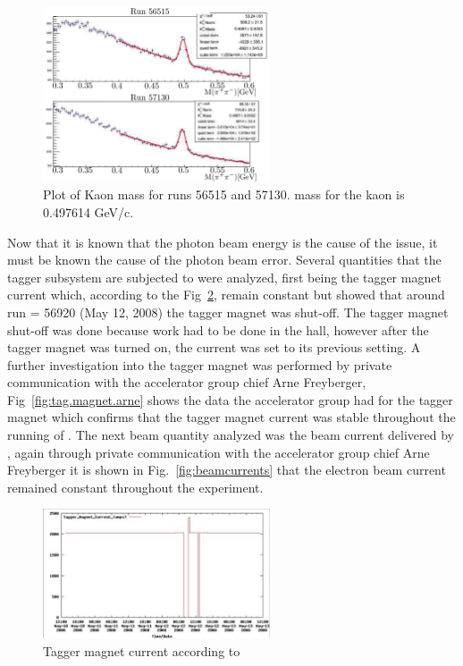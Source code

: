\begin{figure}\begin{center}
\includegraphics[width=0.6\textwidth]{figures/calib/tag/ecor/Kaon_mass.eps}
\caption[Kaon Mass for Run 56515 and 57130]{\label{fig:beamcor.k_mass}Plot of Kaon mass for runs 56515 and 57130.   mass for the kaon is 0.497614 GeV/c.}
\end{center}\end{figure}

\FloatBarrier

Now that it is known that the photon beam energy is the cause of the issue, it must be known the cause of the photon beam error. Several quantities that the tagger subsystem are subjected to were analyzed, first being the tagger magnet current which, according to the  Fig~\ref{fig:tag.magnet.epics}, remain constant 
but showed that around run = 56920 (May 12, 2008) the tagger magnet was shut-off. The tagger magnet shut-off was done because work had to be done in the hall, however after the tagger magnet was turned on, the current was set to its previous setting. A further investigation into the tagger magnet was performed by private communication with the accelerator group chief Arne Freyberger, Fig~\ref{fig:tag.magnet.arne} shows the data the accelerator group had for the tagger magnet which confirms that the tagger magnet current was stable throughout the running of . The next beam quantity analyzed was the beam current delivered by , again through private communication with the accelerator group chief Arne Freyberger it is shown in Fig.~\ref{fig:beamcurrents} that the electron beam current remained constant throughout the  experiment.
\begin{figure}\begin{center}
\includegraphics[width=0.6\textwidth]{figures/calib/tag/ecor/600px-Hystersis_smokingGun.eps}
\caption[Current of Tagger Magnet from ]{\label{fig:tag.magnet.epics}Tagger magnet current according to }
\end{center}\end{figure}

